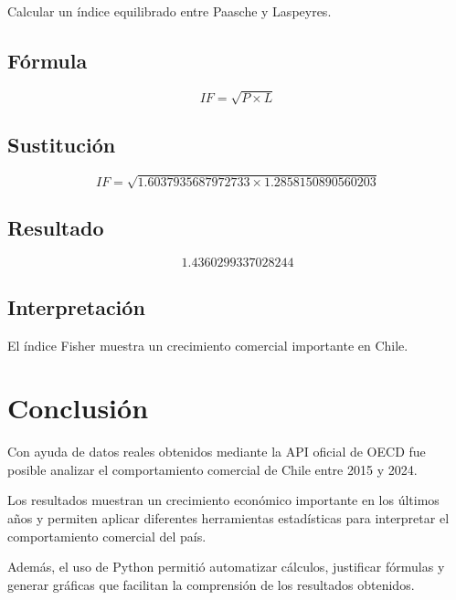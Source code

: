 \documentclass[12pt]{article}
\begin{document}
Calcular un índice equilibrado entre Paasche y Laspeyres.

\subsection*{Fórmula}

\[
IF=\sqrt{P\times L}
\]

\subsection*{Sustitución}

\[
IF=\sqrt{1.6037935687972733 \times 1.2858150890560203}
\]

\subsection*{Resultado}

\[
1.4360299337028244
\]

\subsection*{Interpretación}

El índice Fisher muestra un crecimiento comercial importante en Chile.


\section{Conclusión}

Con ayuda de datos reales obtenidos mediante la API oficial de OECD fue posible analizar el comportamiento comercial de Chile entre 2015 y 2024.

Los resultados muestran un crecimiento económico importante en los últimos años y permiten aplicar diferentes herramientas estadísticas para interpretar el comportamiento comercial del país.

Además, el uso de Python permitió automatizar cálculos, justificar fórmulas y generar gráficas que facilitan la comprensión de los resultados obtenidos.
\end{document}
